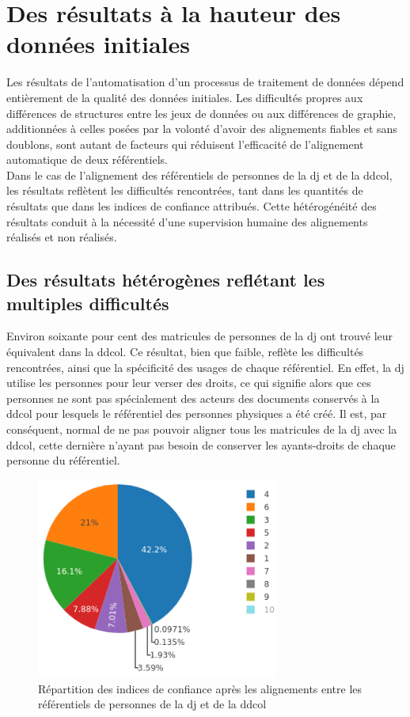 \section{\label{III-C-3}Des résultats à la hauteur des données initiales}

Les résultats de l'automatisation d'un processus de traitement de données dépend entièrement de la qualité des données initiales. Les difficultés propres aux différences de structures entre les jeux de données ou aux différences de graphie, additionnées à celles posées par la volonté d'avoir des alignements fiables et sans doublons, sont autant de facteurs qui réduisent l'efficacité de l'alignement automatique de deux référentiels.\\

Dans le cas de l'alignement des référentiels de personnes de la \ac{dj} et de la \ac{ddcol}, les résultats reflètent les difficultés rencontrées, tant dans les quantités de résultats que dans les indices de confiance attribués. Cette hétérogénéité des résultats conduit à la nécessité d'une supervision humaine des alignements réalisés et non réalisés.

\subsection{\label{III-C-3-a}Des résultats hétérogènes reflétant les multiples difficultés}

Environ soixante pour cent des matricules de personnes de la \ac{dj} ont trouvé leur équivalent dans la \ac{ddcol}. Ce résultat, bien que faible, reflète les difficultés rencontrées, ainsi que la spécificité des usages de chaque référentiel. En effet, la \ac{dj} utilise les personnes pour leur verser des droits, ce qui signifie alors que ces personnes ne sont pas spécialement des acteurs des documents conservés à la \ac{ddcol} pour lesquels le référentiel des personnes physiques a été créé. Il est, par conséquent, normal de ne pas pouvoir aligner tous les matricules de la \ac{dj} avec la \ac{ddcol}, cette dernière n'ayant pas besoin de conserver les ayants-droits de chaque personne du référentiel.

\begin{figure}[!h]
	\centering
	\includegraphics[width=8cm]{images/indices.png}
	\caption{Répartition des indices de confiance après les alignements entre les référentiels de personnes de la \ac{dj} et de la \ac{ddcol}}
	\label{indices}
\end{figure}

